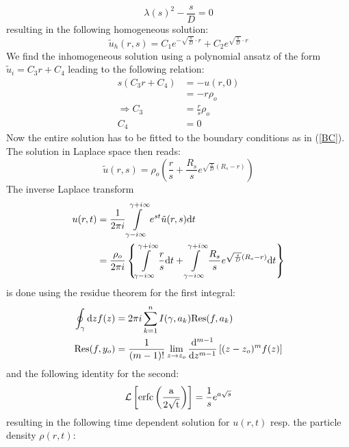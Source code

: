 \begin{equation}
    \lambda(s) ^2 - \frac{s}{D} = 0
    \label{}
\end{equation}
resulting in the following homogeneous solution:
\begin{equation}
    \tilde{u}_h(r,s) = C_1 e^{ - \sqrt{\frac{s}{D}} \cdot r } + C_2 e^{ \sqrt{\frac{s}{D}} \cdot r }
    \label{u_h}
\end{equation}
We find the inhomogeneous solution using a polynomial ansatz of the form $\tilde{u}_i = C_3 r + C_4$ leading to the following relation:
\begin{align}
    s(C_3 r + C_4)  &= -u(r,0)\\
                    &= - r \rho_o \\
    \Rightarrow C_3 &= \frac{r}{s}\rho_o \\
                C_4 &= 0
\end{align}
Now the entire solution has to be fitted to the boundary conditions as in (\ref{BC}). The solution in Laplace space then reads:
\begin{equation}
\tilde{u}(r,s) = \rho_o \left( \frac{r}{s} + \frac{R_s}{s} e^{ \sqrt{\frac{s}{D}}(R_s - r) } \right) 
\end{equation}
The inverse Laplace transform
\begin{align}
    u(r,t)  &= \frac{1}{2 \pi i} \int\limits_{\gamma - i \infty}^{\gamma + i \infty}  e^{st} \tilde{u}(r,s){\rm d}t \\
    &= \frac{\rho_o}{ 2 \pi i} \left\{  \int\limits_{\gamma - i \infty}^{\gamma + i \infty} \frac{r}{s}  {\rm d}t +  \int\limits_{\gamma - i \infty}^{\gamma + i \infty}\frac{R_s}{s} e^{ \sqrt{\frac{s}{D}}(R_s - r) }  {\rm d}t \right\}
    \label{inverse laplace}
\end{align}
is done using the residue theorem for the first integral:
\begin{align}
    \oint_{ \gamma } {\rm d}z f(z) &= 2 \pi i \sum_{k = 1}^{n}I(\gamma, a_k) {\rm Res}(f,a_k) \\
    { \rm Res}(f,y_o) &= \frac{1}{(m-1)!} \lim_{z\rightarrow z_o} \frac{{ \rm d} ^{m-1}}{{\rm d} z^{m-1}} \left[ (z - z_o)^{m}f(z) \right]
    \label{residue theorem}
\end{align}
and the following identity for the second:
\begin{equation}
    \mathcal{L}\left[ {\rm erfc\left( \frac{a}{2\sqrt{t}} \right)} \right] = \frac{1}{s}e^{a\sqrt{s}}
    \label{L(erfc)}
\end{equation}
resulting in the following time dependent solution for $u(r,t)$ resp. the particle density $\rho(r,t)$:
